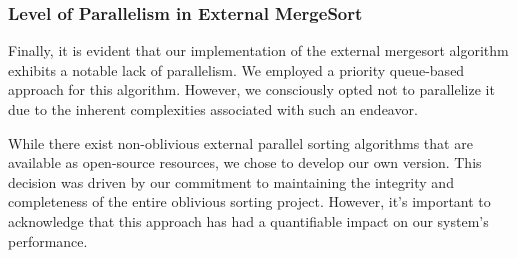 \documentclass{article}
\begin{document}
\subsubsection{Level of Parallelism in External MergeSort}
Finally, it is evident that our implementation of the external mergesort algorithm exhibits a notable lack of parallelism. We employed a priority queue-based approach for this algorithm. However, we consciously opted not to parallelize it due to the inherent complexities associated with such an endeavor.

While there exist non-oblivious external parallel sorting algorithms that are available as open-source resources, we chose to develop our own version. This decision was driven by our commitment to maintaining the integrity and completeness of the entire oblivious sorting project. However, it's important to acknowledge that this approach has had a quantifiable impact on our system's performance.

\newpage
\printbibliography
\end{document}
